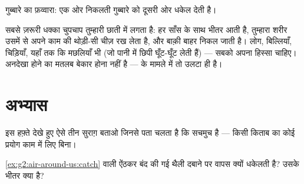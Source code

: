 \begin{omfigure}

{\small गुब्बारे का फ़व्वारा: एक ओर निकलती  गुब्बारे को दूसरी ओर
धकेल देती है।}
\end{omfigure}

\begin{remark}[हवा क़ीमती है]\label{rem:g2:air-around-us:breathe}
सबसे ज़रूरी धक्का चुपचाप तुम्हारी छाती में लगता है: हर साँस के साथ
 भीतर आती है, तुम्हारा शरीर उसमें से अपने काम की थोड़ी-सी चीज़ रख
लेता है, और बाक़ी बाहर निकल जाती है। लोग, बिल्लियाँ, चिड़ियाँ, यहाँ
तक कि मछलियाँ भी (जो पानी में छिपी  घूँट-घूँट लेती हैं) --- सबको
अपना हिस्सा चाहिए। अनदेखा होने का मतलब बेकार होना नहीं है ---  के
मामले में तो उलटा ही है।
\end{remark}

\section{अभ्यास}

\begin{exercise}[$\star$]\label{exo:g2:air-around-us:1}
इस हफ़्ते देखे हुए ऐसे तीन सुराग़ बताओ जिनसे पता चलता है कि 
सचमुच है --- किसी किताब का कोई प्रयोग काम में लिए बिना।
\end{exercise}

\begin{exercise}[$\star$]\label{exo:g2:air-around-us:2}
\cref{ex:g2:air-around-us:catch} वाली ऐंठकर बंद की गई थैली दबाने पर
वापस क्यों धकेलती है? उसके भीतर क्या है?
\end{exercise}

